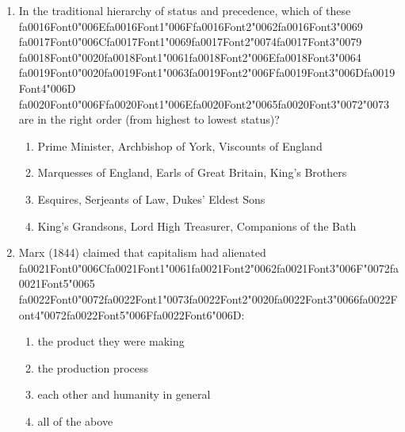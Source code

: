 \documentclass[12pt]{article}
\begin{document}
\begin{enumerate}[label=\arabic*.]
\begin{enumerate}[label=(\alph*)]
    \item a significant figure in early childhood who teaches us the general values of society
    \item an image of how people in the wider society might perceive our behaviour
\end{enumerate}
\item In the traditional hierarchy of status and precedence, which of these {\csname fa0016Font0\endcsname\char"006E}{\csname fa0016Font1\endcsname\char"006F}{\csname fa0016Font2\endcsname\char"0062}{\csname fa0016Font3\endcsname\char"0069} {\csname fa0017Font0\endcsname\char"006C}{\csname fa0017Font1\endcsname\char"0069}{\csname fa0017Font2\endcsname\char"0074}{\csname fa0017Font3\endcsname\char"0079} {\csname fa0018Font0\endcsname\char"0020}{\csname fa0018Font1\endcsname\char"0061}{\csname fa0018Font2\endcsname\char"006E}{\csname fa0018Font3\endcsname\char"0064} {\csname fa0019Font0\endcsname\char"0020}{\csname fa0019Font1\endcsname\char"0063}{\csname fa0019Font2\endcsname\char"006F}{\csname fa0019Font3\endcsname\char"006D}{\csname fa0019Font4\endcsname\char"006D} {\csname fa0020Font0\endcsname\char"006F}{\csname fa0020Font1\endcsname\char"006E}{\csname fa0020Font2\endcsname\char"0065}{\csname fa0020Font3\endcsname\char"0072}{\char"0073} are in the right order (from highest to lowest status)?
\begin{enumerate}[label=(\alph*)]
    \item Prime Minister, Archbishop of York, Viscounts of England
    \item Marquesses of England, Earls of Great Britain, King's Brothers
    \item Esquires, Serjeants of Law, Dukes' Eldest Sons
    \item King's Grandsons, Lord High Treasurer, Companions of the Bath
\end{enumerate}
\item Marx (1844) claimed that capitalism had alienated {\csname fa0021Font0\endcsname\char"006C}{\csname fa0021Font1\endcsname\char"0061}{\csname fa0021Font2\endcsname\char"0062}{\csname fa0021Font3\endcsname\char"006F}{\char"0072}{\csname fa0021Font5\endcsname\char"0065} {\csname fa0022Font0\endcsname\char"0072}{\csname fa0022Font1\endcsname\char"0073}{\csname fa0022Font2\endcsname\char"0020}{\csname fa0022Font3\endcsname\char"0066}{\csname fa0022Font4\endcsname\char"0072}{\csname fa0022Font5\endcsname\char"006F}{\csname fa0022Font6\endcsname\char"006D}:
\begin{enumerate}[label=(\alph*)]
    \item the product they were making
    \item the production process
    \item each other and humanity in general
    \item all of the above
\end{enumerate}
\end{enumerate}
\end{document}
